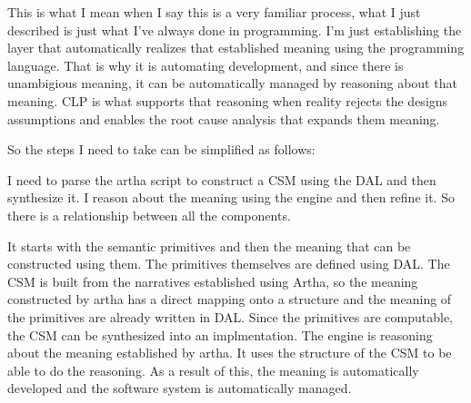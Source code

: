 This is what I mean when I say this is a very familiar process, what I just described is just what I've always done in programming. I'm just establishing the layer that automatically realizes that established meaning using the programming language. That is why it is automating development, and since there is unambigious meaning, it can be automatically managed by reasoning about that meaning. CLP is what supports that reasoning when reality rejects the designs assumptions and enables the root cause analysis that expands them meaning.

So the steps I need to take can be simplified as follows: 

I need to parse the artha script to construct a CSM using the DAL and then synthesize it. I reason about the meaning using the engine and then refine it. So there is a relationship between all the components. 

It starts with the semantic primitives and then the meaning that can be constructed using them. The primitives themselves are defined using DAL. The CSM is built from the narratives established using Artha, so the meaning constructed by artha has a direct mapping onto a structure and the meaning of the primitives are already written in DAL. Since the primitives are computable, the CSM can be synthesized into an implmentation. The engine is reasoning about the meaning established by artha. It uses the structure of the CSM to be able to do the reasoning. As a result of this, the meaning is automatically developed and the software system is automatically managed.